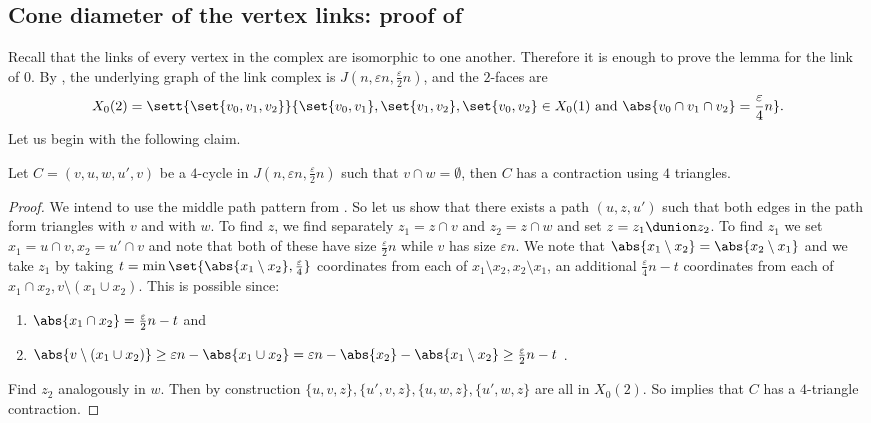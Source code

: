 \subsection[Cone diameter of the vertex links]{Cone diameter of the vertex links: proof of }
Recall that the links of every vertex in the complex are isomorphic to one another. Therefore it is enough to prove the lemma for the link of \(0\). By , the underlying graph of the link complex is \(J(n,\varepsilon n, \frac{\varepsilon}{2}n)\), and the $2$-faces are 
\[ X_0(2) = \sett{\set{v_0,v_1,v_2}}{\set{v_0,v_1},\set{v_1,v_2},\set{v_0,v_2} \in X_0(1) \text{ and }\abs{v_0 \cap v_1 \cap v_2} = \frac{\varepsilon}{4}n}.\]
Let us begin with the following claim.
\begin{claim} \label{claim:contracting-almost-disjoint-4-cycles-link-X}
    Let \(C = (v,u,w,u',v)\) be a \(4\)-cycle in \(J(n,\varepsilon n, \frac{\varepsilon}{2}n)\) 
    such that \(v \cap w = \emptyset \), then \(C\) has a contraction using \(4\) triangles.
\end{claim}

\begin{proof}
    We intend to use the middle path pattern from . So let us show that there exists a path \((u,z,u')\) such that both edges in the path form triangles with \(v\) and with \(w\). 
    To find $z$, we find separately \(z_1 = z \cap v\) and \(z_2 = z \cap w\) and set \(z= z_1 \dunion z_2\). To find \(z_1\) we set \(x_1=u \cap v , x_2 = u' \cap v\) and note that both of these have size \(\frac{\varepsilon}{2}n\) while $v$ has size $\varepsilon n$. We note that \(\abs{x_1 \setminus x_2} = \abs{x_2 \setminus x_1}\) and we take \(z_1\) by taking \(t=\min \set{\abs{x_1 \setminus x_2}, \frac{\varepsilon}{4}}\) coordinates from each of \(x_1 \setminus x_2, x_2 \setminus x_1\), an additional \(\frac{\varepsilon}{4}n - t\) coordinates from each of \(x_1 \cap x_2, v \setminus (x_1 \cup x_2)\). This is possible since:
    \begin{enumerate}
        \item \(\abs{x_1 \cap x_2} = \frac{\varepsilon}{2}n-t\) and
        \item  \(\abs{v \setminus (x_1 \cup x_2) } \geq \varepsilon n - \abs{x_1 \cup x_2} = \varepsilon n -\abs{x_2} - \abs{x_1 \setminus x_2} \ge \frac{\varepsilon}{2}n-t \) .
    \end{enumerate}
    Find $z_2$ analogously in $w$. Then by construction $\{u,v,z\},\{u',v,z\},\{u,w,z\},\{u',w,z\}$ are all in $X_0(2)$. So  implies that $C$ has a \(4\)-triangle contraction. 
\end{proof}

